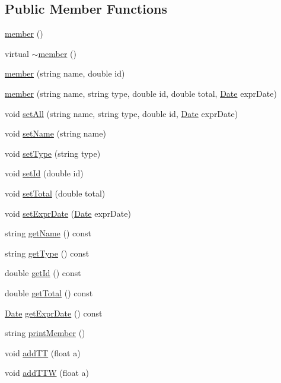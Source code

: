 \subsection*{Public Member Functions}
\begin{DoxyCompactItemize}
\item 
\hyperlink{classmember_a4153f13605eac8adf8dde89ee7d18c02}{member} ()
\item 
virtual \hyperlink{classmember_a50adc47b77a0d94f733fb10c86aea68e}{$\sim$member} ()
\item 
\hyperlink{classmember_a794180d2d6fa271481272236548d6386}{member} (string name, double id)
\item 
\hyperlink{classmember_a634696f2f13c490f15a808d6fc7b8760}{member} (string name, string type, double id, double total, \hyperlink{class_date}{Date} expr\+Date)
\item 
void \hyperlink{classmember_a157a14ed52141008eb752c81439b076f}{set\+All} (string name, string type, double id, \hyperlink{class_date}{Date} expr\+Date)
\item 
void \hyperlink{classmember_aacf730a181e4297f591d091904f3bff0}{set\+Name} (string name)
\item 
void \hyperlink{classmember_a653f57c729f193880ac5b9de0a20f00f}{set\+Type} (string type)
\item 
void \hyperlink{classmember_a4f4408ae1e3eab368421e4a14acb4862}{set\+Id} (double id)
\item 
void \hyperlink{classmember_a5139dca4fca69e8d30c1f0288d4f3621}{set\+Total} (double total)
\item 
void \hyperlink{classmember_ab1e537d3045c7edd5c41ede5b642f650}{set\+Expr\+Date} (\hyperlink{class_date}{Date} expr\+Date)
\item 
string \hyperlink{classmember_a770923ee1577e502e81a1bdd67adc160}{get\+Name} () const 
\item 
string \hyperlink{classmember_ad65689d73a5fda2056812f28f3f3964a}{get\+Type} () const 
\item 
double \hyperlink{classmember_a8480c82a63ed03776f0c78b835333f06}{get\+Id} () const 
\item 
double \hyperlink{classmember_a2aebb843786f51ee65432e9d57f49651}{get\+Total} () const 
\item 
\hyperlink{class_date}{Date} \hyperlink{classmember_ada678a9b2a2eee0013c5799f1f188c98}{get\+Expr\+Date} () const 
\item 
string \hyperlink{classmember_a5a59485fe82f153c1091aedbade0a444}{print\+Member} ()
\item 
void \hyperlink{classmember_a579defee4357502e7dcd3e3750d114dc}{add\+TT} (float a)
\item 
void \hyperlink{classmember_ab6926f5ba8577dd1d6531cf423437948}{add\+T\+TW} (float a)
\end{DoxyCompactItemize}
